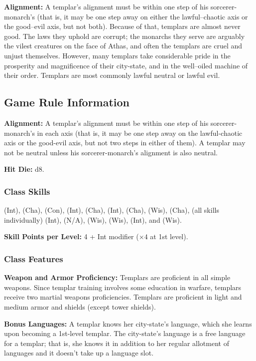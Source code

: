 \textbf{Alignment:} A templar's alignment must be within one step of his sorcerer-monarch's (that is, it may be one step away on either the lawful--chaotic axis or the good--evil axis, but not both). Because of that, templars are almost never good. The laws they uphold are corrupt; the monarchs they serve are arguably the vilest creatures on the face of Athas, and often the templars are cruel and unjust themselves. However, many templars take considerable pride in the prosperity and magnificence of their city-state, and in the well--oiled machine of their order. Templars are most commonly lawful neutral or lawful evil.

\subsection{Game Rule Information}
\textbf{Alignment:} A templar's alignment must be within one step of his sorcerer-monarch's in each axis (that is, it may be one step away on the lawful-chaotic axis or the good-evil axis, but not two steps in either of them). A templar may not be neutral unless his sorcerer-monarch's alignment is also neutral.

\textbf{Hit Die:} d8.

\subsubsection{Class Skills}
 (Int),  (Cha),  (Con),  (Int),  (Cha),  (Int),  (Cha),  (Wis),  (Cha),  (all skills individually) (Int),  (N/A),  (Wis),  (Wis),  (Int), and  (Wis).

\textbf{Skill Points per Level:} 4 + Int modifier ($\times 4$ at 1st level).

\subsubsection{Class Features}
\textbf{Weapon and Armor Proficiency:} Templars are proficient in all simple weapons. Since templar training involves some education in warfare, templars receive two martial weapons proficiencies. Templars are proficient in light and medium armor and shields (except tower shields).

\textbf{Bonus Languages:} A templar knows her city-state's language, which she learns upon becoming a 1st-level templar. The city-state's language is a free language for a templar; that is, she knows it in addition to her regular allotment of languages and it doesn't take up a language slot.

